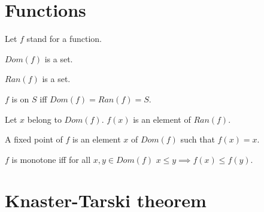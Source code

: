 \documentclass{article}
\begin{document}
  \section{Functions}

  \begin{forthel}

    Let $f$ stand for a function.

    \begin{signature}[DomSort]
      $Dom(f)$ is a set.
    \end{signature}

    \begin{signature}[RanSort]
      $Ran(f)$ is a set.
    \end{signature}

    \begin{definition}[DefDom]
      $f$ is on $S$ iff $Dom(f) = Ran(f) = S$.
    \end{definition}

    \begin{axiom}[ImgSort]
      Let $x$ belong to $Dom(f)$. $f(x)$ is an element of $Ran(f)$.
    \end{axiom}

    \begin{definition}[DefFix]
      A fixed point of $f$ is an element $x$ of $Dom(f)$ such that $f(x) = x$.
    \end{definition}

    \begin{definition}[DefMonot]
      $f$ is monotone iff for all $x,y \in Dom(f)$ $x \leq y \implies f(x) \leq f(y)$.
    \end{definition}
  \end{forthel}

  \section{Knaster-Tarski theorem}
\end{document}
